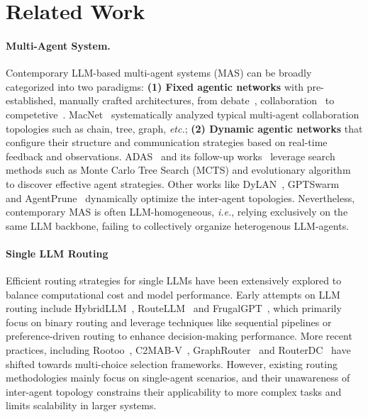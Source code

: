 \section{Related Work}
\vspace{-0.4em}
\paragraph {Multi-Agent System.}
Contemporary LLM-based multi-agent systems (MAS) can be broadly categorized into two paradigms: \textbf{(1) Fixed agentic networks} with pre-established, manually crafted architectures, from debate~\citep{chateval,debate2-thu}, collaboration~\citep{eot,NAACL2024_Agent-Self-Collaboration} to competetive~\citep{zhao2023competeai}. MacNet~\citep{qian2024scaling} systematically analyzed typical multi-agent collaboration topologies such as chain, tree, graph, \textit{etc.}; \textbf{(2) Dynamic agentic networks} that configure their structure and communication strategies based on real-time feedback and observations. ADAS~\citep{ADAS} and its follow-up works~\citep{zhang_aflow_2024,shang2024agentsquareautomaticllmagent} leverage search methods such as Monte Carlo Tree Search (MCTS) and evolutionary algorithm~\citep{zhang2025evoflow} to discover effective agent strategies. Other works like DyLAN~\citep{arXiv2023_Dynamic-LLM-Agent}, GPTSwarm~\citep{zhuge2024gptswarm} and AgentPrune~\citep{zhang2024cutcrapeconomicalcommunication} dynamically optimize the inter-agent topologies. Nevertheless, contemporary MAS is often LLM-homogeneous, \textit{i.e.}, relying exclusively on the same LLM backbone, failing to collectively organize heterogenous LLM-agents.


\vspace{-0.4em}
\paragraph{Single LLM Routing}
Efficient routing strategies for single LLMs have been extensively explored to balance computational cost and model performance.
Early attempts on LLM routing include HybridLLM~\citep{ding2024hybridllmcostefficientqualityaware}, RouteLLM~\citep{ong2024routellmlearningroutellms} and FrugalGPT~\citep{chen2023frugalgptuselargelanguage}, which primarily focus on binary routing and leverage techniques like sequential pipelines or preference-driven routing to enhance decision-making performance. More recent practices, including Rootoo~\cite{dai2024costeffectiveonlinemultillmselection}, C2MAB-V~\cite{mohammadshahi2024routoolearningroutelarge}, GraphRouter~\citep{feng2024graphroutergraphbasedrouterllm} and RouterDC~\cite{chen2024routerdc} have shifted towards multi-choice selection frameworks. However, existing routing methodologies mainly focus on single-agent scenarios, and their unawareness of inter-agent topology constrains their applicability to more complex tasks and limits scalability in larger systems.